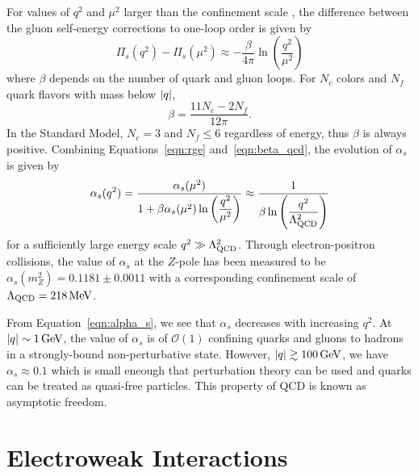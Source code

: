 For values of $q^2$ and $\mu^2$ larger than the confinement scale \lqcd, the difference between the gluon self-energy corrections to one-loop order is given by 
\begin{equation}
  \label{eqn:beta_qcd}
  \Pi_s(q^2) - \Pi_s(\mu^2) \approx - \frac{\beta}{4\pi} \ln \left( \dfrac{q^2}{\mu^2} \right)
\end{equation}
where $\beta$ depends on the number of quark and gluon loops.
For $N_c$ colors and $N_f$ quark flavors with mass below $\lvert q \rvert$,
\begin{equation}
  \beta = \frac{11 N_c - 2 N_f}{12 \pi}. 
\end{equation}
In the Standard Model, $N_c = 3$ and $N_f \le 6$ regardless of energy, thus $\beta$ is always positive.
Combining Equations~\ref{eqn:rge} and~\ref{eqn:beta_qcd}, the evolution of $\alpha_s$ is given by
\begin{equation}
  \label{eqn:alpha_s}
  \alpha_s (q^2) = \frac{\alpha_s(\mu^2)}{1 + \beta \alpha_s (\mu^2) \ln \left( \dfrac{q^2}{\mu^2} \right)} \approx \frac{1}{\beta \ln \left( \dfrac{q^2}{\Lambda_{\text{QCD}}^2} \right)}
\end{equation}
for a sufficiently large energy scale $q^2 \gg \Lambda_{\text{QCD}}^2$.
Through electron-positron collisions, the value of $\alpha_s$ at the $Z$-pole has been measured to be $\alpha_s (m_Z^2) = 0.1181 \pm 0.0011$ with a corresponding confinement scale of $\Lambda_{\text{QCD}} = 218\,\text{Me\hspace{-.08em}V}$.  

From Equation~\ref{eqn:alpha_s}, we see that $\alpha_s$ decreases with increasing $q^2$.
At $\lvert q \rvert \sim 1\,\text{Ge\hspace{-.08em}V}$, the value of $\alpha_s$ is of $\mathcal{O}(1)$ confining quarks and gluons to hadrons in a strongly-bound non-perturbative state.
However, $\lvert q \rvert \gtrsim 100\,\text{Ge\hspace{-.08em}V}$, we have $\alpha_s \approx 0.1$ which is small eneough that perturbation theory can be used and quarks can be treated as quasi-free particles.
This property of QCD is known as asymptotic freedom.

\section{Electroweak Interactions}
\label{sec:ewk}


